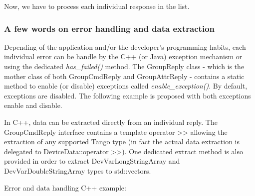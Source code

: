 Now, we have to process each \textquotedbl{}individual response\textquotedbl{}
in the list. 


\subsubsection{A few words on error handling and data extraction}

Depending of the application and/or the developer's programming habits,
each individual error can be handle by the C++ (or Java) exception
mechanism or using the dedicated \emph{has\_failed()}
method. The GroupReply class - which is the mother
class of both GroupCmdReply and GroupAttrReply
- contains a static method to enable (or disable) exceptions called
\emph{enable\_exception()}. By default,
exceptions are disabled. The following example is proposed with both
exceptions enable and disable. 

In C++, data can be extracted directly from an individual reply. The
GroupCmdReply interface contains a template operator >\textcompwordmark{}>
allowing the extraction of any supported Tango type (in fact the actual
data extraction is delegated to DeviceData::operator >\textcompwordmark{}>).
One dedicated extract method is also provided in order to extract
DevVarLongStringArray and DevVarDoubleStringArray types to std::vectors.

Error and data handling C++ example:

